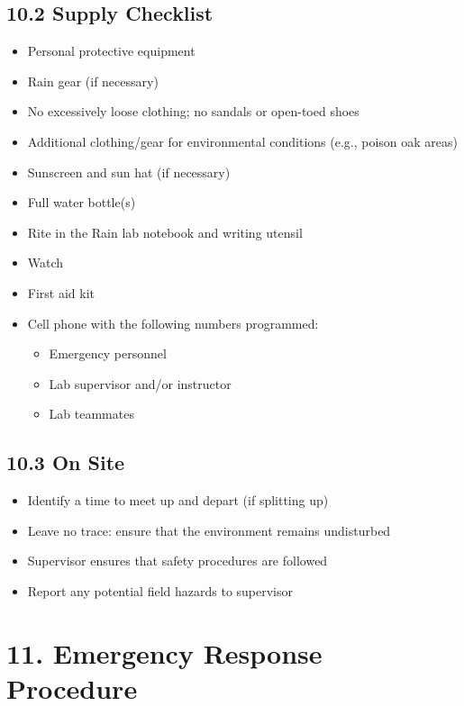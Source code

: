 \documentclass[
  11pt,
  letterpaper,
]{article}
\providecommand{\tightlist}{%
  \setlength{\itemsep}{0pt}\setlength{\parskip}{0pt}}
\begin{document}
\subsection{10.2 Supply Checklist}\label{supply-checklist}

\begin{itemize}
\tightlist
\item[$\square$]
  Personal protective equipment
\item[$\square$]
  Rain gear (if necessary)
\item[$\square$]
  No excessively loose clothing; no sandals or open-toed shoes
\item[$\square$]
  Additional clothing/gear for environmental conditions (e.g., poison
  oak areas)
\item[$\square$]
  Sunscreen and sun hat (if necessary)
\item[$\square$]
  Full water bottle(s)
\item[$\square$]
  Rite in the Rain lab notebook and writing utensil
\item[$\square$]
  Watch
\item[$\square$]
  First aid kit
\item[$\square$]
  Cell phone with the following numbers programmed:

  \begin{itemize}
  \tightlist
  \item
    Emergency personnel
  \item
    Lab supervisor and/or instructor
  \item
    Lab teammates
  \end{itemize}
\end{itemize}

\subsection{10.3 On Site}\label{on-site}

\begin{itemize}
\tightlist
\item
  Identify a time to meet up and depart (if splitting up)
\item
  Leave no trace: ensure that the environment remains undisturbed
\item
  Supervisor ensures that safety procedures are followed
\item
  Report any potential field hazards to supervisor
\end{itemize}

\section{11. Emergency Response
Procedure}\label{emergency-response-procedure}
\end{document}
